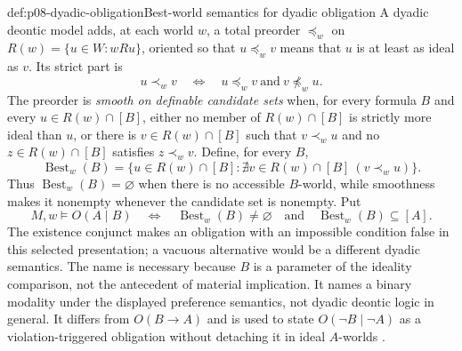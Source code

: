 \begin{hbdefinition}{def:p08-dyadic-obligation}{Best-world semantics for dyadic obligation}
A dyadic deontic model adds, at each world \(w\), a total preorder
\(\preceq_w\) on
\(R(w)=\{u\in W:wRu\}\), oriented so that
\(u\preceq_w v\) means that \(u\) is at least as ideal as \(v\).  Its strict
part is
\[
 u\prec_w v
 \quad\Longleftrightarrow\quad
 u\preceq_w v\ \text{and}\ v\not\preceq_w u.
\]
The preorder is \emph{smooth on definable candidate sets} when, for every
formula \(B\) and every \(u\in R(w)\cap[B]\), either no member of
\(R(w)\cap[B]\) is strictly more ideal than \(u\), or there is
\(v\in R(w)\cap[B]\) such that \(v\prec_w u\) and no
\(z\in R(w)\cap[B]\) satisfies \(z\prec_w v\).  Define, for every \(B\),
\[
 \operatorname{Best}_w(B)
 =\{u\in R(w)\cap[B]:
       \nexists v\in R(w)\cap[B]\ (v\prec_w u)\}.
\]
Thus \(\operatorname{Best}_w(B)=\varnothing\) when there is no accessible
\(B\)-world, while smoothness makes it nonempty whenever the candidate set is
nonempty.  Put
\[
 M,w\models O(A\mid B)
 \quad\Longleftrightarrow\quad
 \operatorname{Best}_w(B)\ne\varnothing
 \quad\text{and}\quad
 \operatorname{Best}_w(B)\subseteq[A].
\]
The existence conjunct makes an obligation with an impossible condition false
in this selected presentation; a vacuous alternative would be a different
dyadic semantics.
The name is necessary because \(B\) is a parameter of the ideality comparison,
not the antecedent of material implication.  It names a binary modality under
the displayed preference semantics, not dyadic deontic logic in general.  It
differs from \(O(B\to A)\) and is used to state
\(O(\neg B\mid\neg A)\) as a violation-triggered obligation without detaching
it in ideal \(A\)-worlds \cite{Hansson1969}.
\end{hbdefinition}

